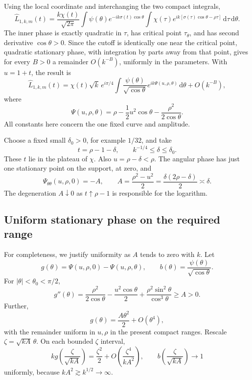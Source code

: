 \documentclass[11pt,a4paper]{article}
\theoremstyle{remark}
\newcommand{\dd}{\,\mathrm d}
\begin{document}
Using the local coordinate and interchanging the two compact integrals,
\begin{equation}\label{eq:Lhat}
 \widehat L_{1,k,m}(t)=\frac{k\chi(t)}{\sqrt{2\pi}}
 \int\psi(\theta)e^{-ik\sigma(t)\cos\theta}
 \int\chi(\tau)e^{ik[\sigma(\tau)\cos\theta-\rho\tau]}
 \dd\tau\dd\theta.
\end{equation}
The inner phase is exactly quadratic in $\tau$, has critical point $\tau_\theta$, and has second derivative $\cos\theta>0$. Since the cutoff is identically one near the critical point, quadratic stationary phase, with integration by parts away from that point, gives for every $B>0$ a remainder $O(k^{-B})$, uniformly in the parameters. With $u=1+t$, the result is
\begin{equation}\label{eq:stationtau}
 \widehat L_{1,k,m}(t)=\chi(t)\sqrt{k}\,e^{i\pi/4}
 \int \frac{\psi(\theta)}{\sqrt{\cos\theta}}
 e^{ik\Psi(u,\rho,\theta)}\dd\theta+O(k^{-B}),
\end{equation}
where
\begin{equation}\label{eq:Psi}
 \Psi(u,\rho,\theta)=\rho-\frac12u^2\cos\theta
 -\frac{\rho^2}{2\cos\theta}.
\end{equation}
All constants here concern the one fixed curve and amplitude.

Choose a fixed small $\delta_0>0$, for example $1/32$, and take
\[
 t=\rho-1-\delta,\qquad k^{-1/4}\le\delta\le\delta_0.
\]
These $t$ lie in the plateau of $\chi$. Also $u=\rho-\delta<\rho$. The angular phase has just one stationary point on the support, at zero, and
\[
 \Psi_{\theta\theta}(u,\rho,0)=-A,
 \qquad A=\frac{\rho^2-u^2}{2}
       =\frac{\delta(2\rho-\delta)}2\asymp\delta.
\]
The degeneration $A\downarrow0$ as $t\uparrow\rho-1$ is responsible for the logarithm.

\subsection{Uniform stationary phase on the required range}

For completeness, we justify uniformity as $A$ tends to zero with $k$. Let
\[
 g(\theta)=\Psi(u,\rho,0)-\Psi(u,\rho,\theta),\qquad
 b(\theta)=\frac{\psi(\theta)}{\sqrt{\cos\theta}}.
\]
For $|\theta|<\theta_0<\pi/2$,
\begin{equation}\label{eq:gsecond}
 g''(\theta)=\frac{\rho^2}{2\cos\theta}
 -\frac{u^2\cos\theta}{2}
 +\frac{\rho^2\sin^2\theta}{\cos^3\theta}\ge A>0.
\end{equation}
Further,
\[
 g(\theta)=\frac{A\theta^2}{2}+O(\theta^4),
\]
with the remainder uniform in $u,\rho$ in the present compact ranges. Rescale $\zeta=\sqrt{kA}\,\theta$. On each bounded $\zeta$ interval,
\[
 kg\!\left(\frac\zeta{\sqrt{kA}}\right)
 =\frac{\zeta^2}{2}+O\!\left(\frac{\zeta^4}{kA^2}\right),
 \qquad b\!\left(\frac\zeta{\sqrt{kA}}\right)\to1
\]
uniformly, because $kA^2\gtrsim k^{1/2}\to\infty$.
\end{document}
